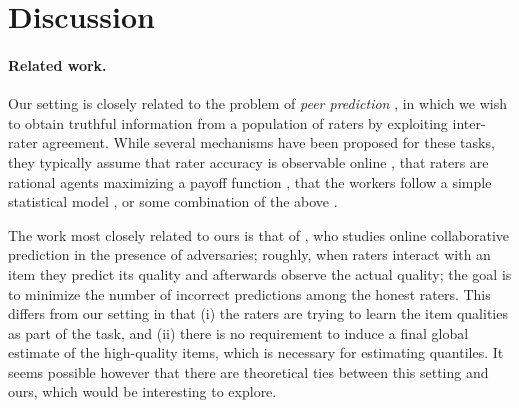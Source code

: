 \section{Discussion}
\label{sec:discussion}


\paragraph{Related work.}
Our setting is closely related to the problem of \emph{peer prediction} 
\citep{miller2005eliciting}, in which we wish to obtain truthful information 
from a population of raters by exploiting inter-rater agreement. 
While several mechanisms have been proposed for these tasks, 
they typically assume that rater accuracy is observable online
\citep{resnick2007influence}, that raters are 
rational agents maximizing a payoff function \citep{dasgupta2013crowdsourced,
kamble2015truth,shnayder2016strong}, that the workers follow a simple 
statistical model \citep{karger2014budget,zhang2014crowdsourcing,
zhou2015regularized}, or some combination of the above \citep{shah2015double,
shah2015approval}. 


The work most closely related to ours is that of \citet{christiano2014provably,
christiano2016robust}, who studies online collaborative prediction in 
the presence of adversaries; roughly, when raters interact with an item 
they predict its quality and afterwards observe the actual quality; the 
goal is to minimize the number of incorrect 
predictions among the honest raters. This differs from our setting in that 
(i) the raters are trying to learn the item qualities as part of the task, 
and (ii) there is no requirement to induce a final global estimate of the 
high-quality items, which is necessary for estimating quantiles.
It seems possible however that there are theoretical ties between this 
setting and ours, which would be interesting to explore.
